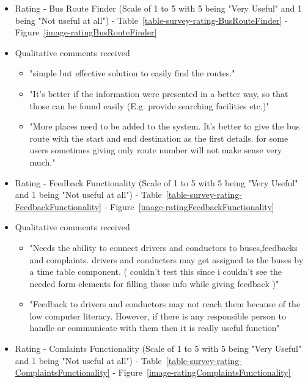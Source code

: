 \begin {itemize}
\item Rating - Bus Route Finder (Scale of 1 to 5 with 5 being "Very Useful" and 1 being "Not useful at all") - Table~\ref{table-survey-rating-BusRouteFinder} - Figure~\ref{image-ratingBusRouteFinder}

\item Qualitative comments received
\begin {itemize}
\item "simple but effective solution to easily find the routes."
\item "It's better if the information were presented in a better way, so that those can be found easily (E.g. provide searching facilities etc.)"
\item "More places need to be added to the system. It's better to give the bus route with the start and end destination as the first details. for some users sometimes giving only route number will not make sense very much."
\end {itemize}

\item Rating - Feedback Functionality (Scale of 1 to 5 with 5 being "Very Useful" and 1 being "Not useful at all") - Table~\ref{table-survey-rating-FeedbackFunctionality} - Figure~\ref{image-ratingFeedbackFunctionality}

\item Qualitative comments received
\begin {itemize}
\item "Needs the ability to connect drivers and conductors to buses,feedbacks and complaints. drivers and conducters may get assigned to the buses by a time table component. ( couldn't test this since i couldn't see the needed form elements for filling those info while giving feedback )"
\item "Feedback to drivers and conductors may not reach them because of the low computer literacy. However, if there is any responsible person to handle or communicate with them then it is really useful function"
\end {itemize}

\item Rating - Comlaints Functionality (Scale of 1 to 5 with 5 being "Very Useful" and 1 being "Not useful at all") - Table~\ref{table-survey-rating-ComplaintsFunctionality} - Figure~\ref{image-ratingComplaintsFunctionality}


\end{itemize}
